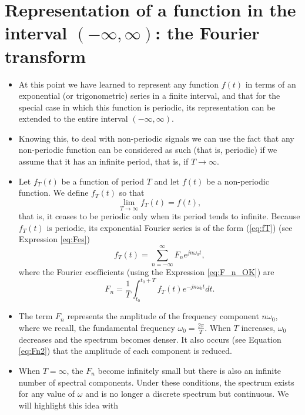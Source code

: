 \section{Representation of a function in the interval $(-\infty, \infty)$: the Fourier transform}
\begin{itemize}
\item At this point we have learned to represent any function $f(t)$ in
  terms of an exponential (or trigonometric) series in a finite
  interval, and that for the special case in which this function is
  periodic, its representation can be extended to the entire interval
  $(-\infty, \infty)$.
\item Knowing this, to deal with non-periodic signals we can use the
  fact that any non-periodic function can be considered as such (that
  is, periodic) if we assume that it has an infinite period, that is,
  if $T\rightarrow\infty$.
\item Let $f_T(t)$ be a function of period $T$ and let $f(t)$ be a non-periodic function. We define $f_T(t)$ so that
  \begin{equation*}
    \lim_{T\rightarrow\infty}f_T(t) = f(t),
  \end{equation*}
  that is, it ceases to be periodic only when its period tends to
  infinite. Because $f_T(t)$ is periodic, its exponential Fourier series
  is of the form (\ref{eq:fT}) (see Expression \ref{eq:Fes})
  \begin{equation}
    f_T(t)=\sum_{n=-\infty}^\infty F_ne^{jn\omega_0t},
    \tag{fT}
    \label{eq:fT}
  \end{equation}
  where the Fourier coefficients (using the Expression
  \ref{eq:F_n_OK}) are
  \begin{equation}
    F_n = \frac{1}{T}\int_{t_0}^{t_0+T} f_T(t)e^{-jn\omega_0t}dt.
    \tag{Fn2}
    \label{eq:Fn2}
  \end{equation}
\item The term $F_n$ represents the amplitude of the frequency
  component $n\omega_0$, where we recall, the fundamental frequency
  $\omega_0=\frac{2\pi}{T}$. When $T$ increases, $\omega_0$ decreases
  and the spectrum becomes denser. It also occurs (see Equation
  \ref{eq:Fn2}) that the amplitude of each component is reduced.
\item When $T=\infty$, the $F_n$ become infinitely small but there is
  also an infinite number of spectral components. Under these
  conditions, the spectrum exists for any value of $\omega$ and is no longer
  a discrete spectrum but continuous. We will highlight this idea with

\end{itemize}
